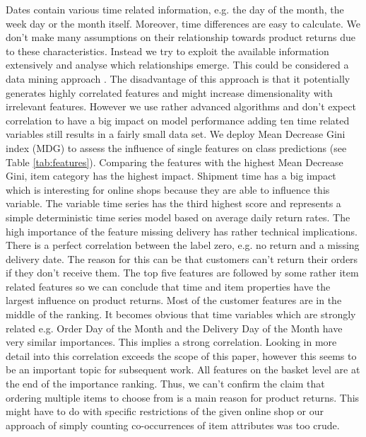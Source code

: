 \documentclass[12pt]{article}
\begin{document}
Dates contain various time related information, e.g. the day of the month, the week day or the month itself. Moreover, time differences are easy to calculate. We don’t make many assumptions on their relationship towards product returns due to these characteristics. Instead we try to exploit the available information extensively and analyse which relationships emerge. This could be considered a data mining approach \cite{hand2007principles}. The disadvantage of this approach is that it potentially generates highly correlated features and might increase dimensionality with irrelevant features. However we use rather advanced algorithms and don’t expect correlation to have a big impact on model performance \cite{nicodemus2009predictor} adding ten time related variables still results in a fairly small data set.
We deploy Mean Decrease Gini index (MDG) \cite{louppe2013understanding} to assess the influence of single features on class predictions (see Table \ref{tab:features}). Comparing the features with the highest Mean Decrease Gini, item category has the highest impact. Shipment time has a big impact which is interesting for online shops because they are able to influence this variable. The variable time series has the third highest score and represents a simple deterministic time series model based on average daily return rates. The high importance of the feature missing delivery has rather technical implications. There is a perfect correlation between the label zero, e.g. no return and a missing delivery date. The reason for this can be that customers can’t return their orders if they don’t receive them. The top five features are followed by some rather item related features so we can conclude that time and item properties have the largest influence on product returns. Most of the customer features are in the middle of the ranking. It becomes obvious that time variables which are strongly related e.g. Order Day of the Month and the Delivery Day of the Month have very similar importances. This implies a strong correlation. Looking in more detail into this correlation exceeds the scope of this paper, however this seems to be an important topic for subsequent work. 
All features on the basket level are at the end of the importance ranking. Thus, we can’t confirm the claim that ordering multiple items to choose from is a main reason for product returns. This might have to do with specific restrictions of the given online shop or our approach of simply counting co-occurrences of item attributes was too crude. \\
\end{document}
